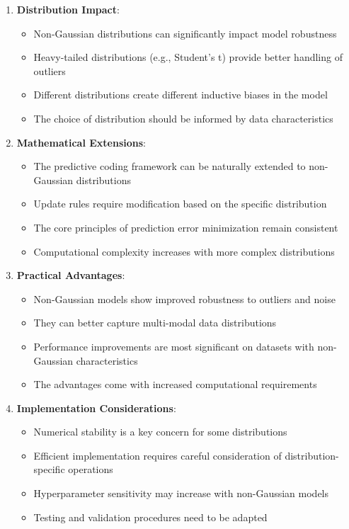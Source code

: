 \documentclass{article}
\begin{document}
\begin{enumerate}
  \item \textbf{Distribution Impact}:
  \begin{itemize}
    \item Non-Gaussian distributions can significantly impact model robustness
    \item Heavy-tailed distributions (e.g., Student's t) provide better handling of outliers
    \item Different distributions create different inductive biases in the model
    \item The choice of distribution should be informed by data characteristics
  \end{itemize}

  \item \textbf{Mathematical Extensions}:
  \begin{itemize}
    \item The predictive coding framework can be naturally extended to non-Gaussian distributions
    \item Update rules require modification based on the specific distribution
    \item The core principles of prediction error minimization remain consistent
    \item Computational complexity increases with more complex distributions
  \end{itemize}

  \item \textbf{Practical Advantages}:
  \begin{itemize}
    \item Non-Gaussian models show improved robustness to outliers and noise
    \item They can better capture multi-modal data distributions
    \item Performance improvements are most significant on datasets with non-Gaussian characteristics
    \item The advantages come with increased computational requirements
  \end{itemize}

  \item \textbf{Implementation Considerations}:
  \begin{itemize}
    \item Numerical stability is a key concern for some distributions
    \item Efficient implementation requires careful consideration of distribution-specific operations
    \item Hyperparameter sensitivity may increase with non-Gaussian models
    \item Testing and validation procedures need to be adapted
  \end{itemize}
\end{enumerate}
\end{document}
